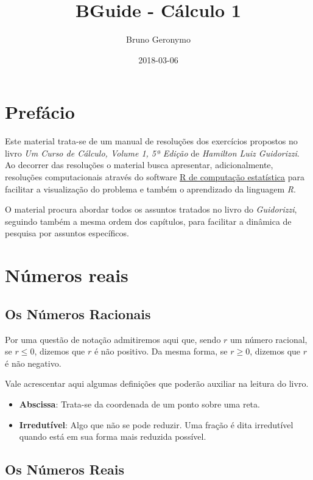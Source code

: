 \documentclass[]{book}
\title{BGuide - Cálculo 1}
\author{Bruno Geronymo}
\date{2018-03-06}
\providecommand{\tightlist}{%
  \setlength{\itemsep}{0pt}\setlength{\parskip}{0pt}}
\begin{document}
\maketitle

{
\setcounter{tocdepth}{1}
\tableofcontents
}
\chapter*{Prefácio}\label{prefacio}

Este material trata-se de um manual de resoluções dos exercícios
propostos no livro \emph{Um Curso de Cálculo, Volume 1, 5ª Edição} de
\emph{Hamilton Luiz Guidorizzi}. Ao decorrer das resoluções o material
busca apresentar, adicionalmente, resoluções computacionais através do
software \href{https://www.r-project.org/}{R de computação estatística}
para facilitar a visualização do problema e também o aprendizado da
linguagem \emph{R}.

O material procura abordar todos os assuntos tratados no livro do
\emph{Guidorizzi}, seguindo também a mesma ordem dos capítulos, para
facilitar a dinâmica de pesquisa por assuntos específicos.

\chapter{Números reais}\label{numeros-reais}

\section{Os Números Racionais}\label{os-numeros-racionais}

Por uma questão de notação admitiremos aqui que, sendo \(r\) um número
racional, se \(r \leqslant 0\), dizemos que \(r\) é não positivo. Da
mesma forma, se \(r \geqslant 0\), dizemos que \(r\) é não negativo.

Vale acrescentar aqui algumas definições que poderão auxiliar na leitura
do livro.

\begin{itemize}
\tightlist
\item
  \textbf{Abscissa}: Trata-se da coordenada de um ponto sobre uma reta.
\item
  \textbf{Irredutível}: Algo que não se pode reduzir. Uma fração é dita
  irredutível quando está em sua forma mais reduzida possível.
\end{itemize}

\section{Os Números Reais}\label{os-numeros-reais}
\end{document}
